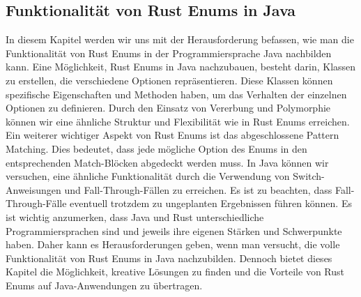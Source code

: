 \documentclass[a4paper, 1ppt]{article}
\begin{document}
\subsection{Funktionalität von Rust Enums in Java}
In diesem Kapitel werden wir uns mit der Herausforderung befassen, wie man die Funktionalität von Rust Enums in der Programmiersprache Java nachbilden kann.
Eine Möglichkeit, Rust Enums in Java nachzubauen, besteht darin, Klassen zu erstellen, die verschiedene Optionen repräsentieren. Diese Klassen können spezifische Eigenschaften und Methoden haben, um das Verhalten der einzelnen Optionen zu definieren. Durch den Einsatz von Vererbung und Polymorphie können wir eine ähnliche Struktur und Flexibilität wie in Rust Enums erreichen.
Ein weiterer wichtiger Aspekt von Rust Enums ist das abgeschlossene Pattern Matching. Dies bedeutet, dass jede mögliche Option des Enums in den entsprechenden Match-Blöcken abgedeckt werden muss. In Java können wir versuchen, eine ähnliche Funktionalität durch die Verwendung von Switch-Anweisungen und Fall-Through-Fällen zu erreichen. Es ist zu beachten, dass Fall-Through-Fälle eventuell trotzdem zu ungeplanten Ergebnissen führen können.
Es ist wichtig anzumerken, dass Java und Rust unterschiedliche Programmiersprachen sind und jeweils ihre eigenen Stärken und Schwerpunkte haben. Daher kann es Herausforderungen geben, wenn man versucht, die volle Funktionalität von Rust Enums in Java nachzubilden. Dennoch bietet dieses Kapitel die Möglichkeit, kreative Lösungen zu finden und die Vorteile von Rust Enums auf Java-Anwendungen zu übertragen.
\end{document}
